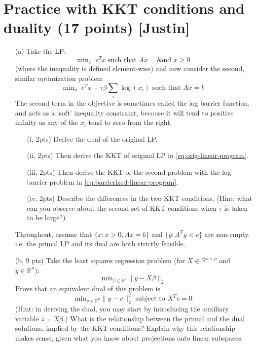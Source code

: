 \documentclass{article}
\theoremstyle{remark}
\theoremstyle{definition}
\begin{document}
\section{Practice with KKT conditions and duality (17 points) [Justin]}
\begin{enumerate}
  \item [(a)] Take the LP:
    \begin{equation}\label{eq:orig-linear-program}
      \text{min}_x \;\; c^Tx \text{ such that } Ax=b \text{
        and } x \ge 0
    \end{equation}
    (where the inequality is defined element-wise) and now consider the second,
    similar optimization problem
    \begin{equation}\label{eq:barrierized-linear-program}
      \text{min}_x\;\; c^Tx - \tau \beta \sum_i \log (x_i) \text{ such that } Ax=b
    \end{equation}
    The second term in the objective is sometimes called the log barrier
    function, and acts as a `soft' inequality constraint, because it will tend
    to positive infinity as any of the $x_i$ tend to zero from the right.
    \begin{enumerate}
        \item[(i, 2pts)] Derive the dual of the original LP.
\item[(ii, 2pts)] Then derive the KKT of original LP in    \eqref{eq:orig-linear-program}.
\item[(iii, 2pts)] Then derive the KKT of the second problem with the log barrier problem
    in \eqref{eq:barrierized-linear-program}.  
\item[(iv, 2pts)] Describe the differences in the two KKT conditions. (Hint: what can you
    observe about the second set of KKT conditions when $\tau$ is taken to be
    large?)  
    \end{enumerate}

    Throughout, assume that $\{x: x>0, Ax=b\}$ and $\{y: A^Ty < c\}$ are
    non-empty. i.e. the primal LP and its dual are both strictly feasible.

  \item [(b, 9 pts)] Take the least squares regression problem (for
    $X\in\mathbb{R}^{n\times p}$ and $y \in \mathbb{R}^n$):
    \begin{equation}
      \text{min}_{\beta\in\mathbb{R}^p}\|y-X\beta\|_2
    \end{equation}
    Prove that an equivalent dual of this problem is
    \begin{equation}
      \text{min}_{v\in\mathbb{R}^n} \|y-v\|_2^2 \text{ subject to } X^Tv = 0
    \end{equation}
    (Hint: in deriving the dual, you may start by introducing the auxiliary
    variable $z=X\beta$.) What is the relationship between the primal and the
    dual solutions, implied by the KKT conditions? Explain why this relationship
    makes sense, given what you know about projections onto linear subspaces.
\end{enumerate}
\end{document}
